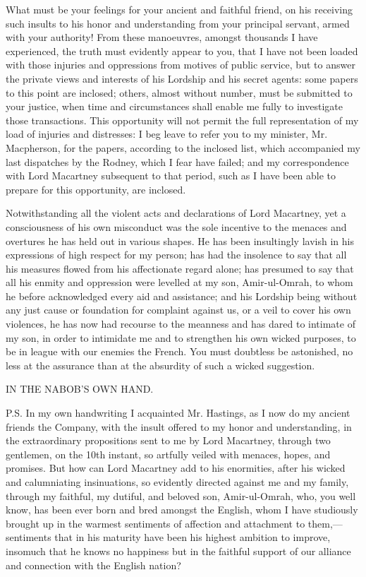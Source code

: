 What must be your feelings for your ancient and faithful friend, on his receiving such insults to his honor and understanding from your principal servant, armed with your authority! From these manoeuvres, amongst thousands I have experienced, the truth must evidently appear to you, that I have not been loaded with those injuries and oppressions from motives of public service, but to answer the private views and interests of his Lordship and his secret agents: some papers to this point are inclosed; others, almost without number, must be submitted to your justice, when time and circumstances shall enable me fully to investigate those transactions. This opportunity will not permit the full representation of my load of injuries and distresses: I beg leave to refer you to my minister, Mr. Macpherson, for the papers, according to the inclosed list, which accompanied my last dispatches by the Rodney, which I fear have failed; and my correspondence with Lord Macartney subsequent to that period, such as I have been able to prepare for this opportunity, are inclosed.

Notwithstanding all the violent acts and declarations of Lord Macartney, yet a consciousness of his own misconduct was the sole incentive to the menaces and overtures he has held out in various shapes. He has been insultingly lavish in his expressions of high respect for my person; has had the insolence to say that all his measures flowed from his affectionate regard alone; has presumed to say that all his enmity and oppression were levelled at my son, Amir-ul-Omrah, to whom he before acknowledged every aid and assistance; and his Lordship being without any just cause or foundation for complaint against us, or a veil to cover his own violences, he has now had recourse to the meanness and has dared to intimate of my son, in order to intimidate me and to strengthen his own wicked purposes, to be in league with our enemies the French. You must doubtless be astonished, no less at the assurance than at the absurdity of such a wicked suggestion.

\vspace{0.5cm}
\centerline{IN THE NABOB'S OWN HAND.}

P.S. In my own handwriting I acquainted Mr. Hastings, as I now do my ancient friends the Company, with the insult offered to my honor and understanding, in the extraordinary propositions sent to me by Lord Macartney, through two gentlemen, on the 10th instant, so artfully veiled with menaces, hopes, and promises. But how can Lord Macartney add to his enormities, after his wicked and calumniating insinuations, so evidently directed against me and my family, through my faithful, my dutiful, and beloved son, Amir-ul-Omrah, who, you well know, has been ever born and bred amongst the English, whom I have studiously brought up in the warmest sentiments of affection and attachment to them,—sentiments that in his maturity have been his highest ambition to improve, insomuch that he knows no happiness but in the faithful support of our alliance and connection with the English nation?

